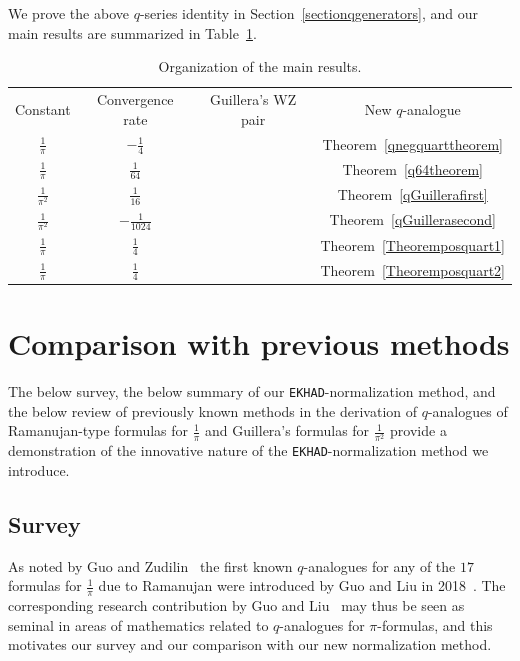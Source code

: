 \documentclass[12pt]{article}
\begin{document}
 We prove the above $q$-series identity in 
 Section~\ref{sectionqgenerators}, and our main results
 are summarized in Table~\ref{tableorg}. 

\begin{table}[h!]
	\centering
	\begin{tabular}{|c c c c|} 
		\hline
 	 Constant & Convergence rate & Guillera's WZ pair & New $q$-analogue \\ [0.5ex] 
 $\frac{1}{\pi}$ & $-\frac{1}{4}$ & \cite{Guillera2002} & Theorem~\ref{qnegquarttheorem} \\ [1.5ex] 
 $\frac{1}{\pi}$ & $\frac{1}{64}$ & \cite{Guillera2002} & Theorem~\ref{q64theorem} \\ [1.5ex] 
 $\frac{1}{\pi^2}$ & $\frac{1}{16}$ & \cite{Guillera2002} & Theorem~\ref{qGuillerafirst} \\ [1.5ex]
 $\frac{1}{\pi^2}$ & $-\frac{1}{1024}$ & \cite{Guillera2002} & Theorem~\ref{qGuillerasecond} \\ [1.5ex] 
 $\frac{1}{\pi}$ & $\frac{1}{4}$ & \cite{Guillera2006} & Theorem~\ref{Theoremposquart1} \\ [1.5ex]
	 	 $\frac{1}{\pi}$ & 
 $\frac{1}{4}$ & \cite{Guillera2006} & Theorem~\ref{Theoremposquart2} \\ [1.5ex] 
		\hline 
	\end{tabular}
	\caption{Organization of the main results. }
	\label{tableorg}
\end{table}

\section{Comparison with previous methods}
 The below survey, 
 the below summary of our {\tt EKHAD}-normalization method, 
 and the below review of previously known methods in the derivation of $q$-analogues of 
 Ramanujan-type formulas for $\frac{1}{\pi}$ and Guillera's formulas for $\frac{1}{\pi^2}$ 
 provide a demonstration of the innovative nature of 
 the {\tt EKHAD}-normalization method we introduce. 

\subsection{Survey}\label{sectionsurvey}
 As noted by Guo and Zudilin~\cite{GuoZudilin2018} the first known $q$-analogues for any of the $17$ formulas for $\frac{1}{\pi}$ 
 due to Ramanujan were introduced by Guo and Liu in 2018~\cite{GuoLiu2018}. 
 The corresponding research contribution by Guo and Liu~\cite{GuoLiu2018} 
 may thus be seen as seminal in areas of mathematics related to $q$-analogues for $\pi$-formulas, 
 and this motivates our survey and our comparison with our new normalization method. 
\end{document}
